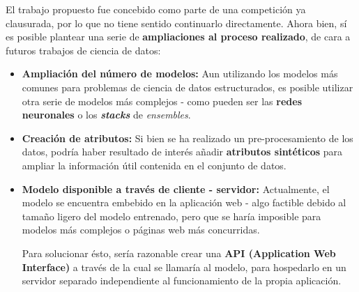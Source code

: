 El trabajo propuesto fue concebido como parte de una competición ya clausurada, por lo que no tiene sentido continuarlo directamente. Ahora bien, sí es posible plantear una serie de \textbf{ampliaciones al proceso realizado}, de cara a futuros trabajos de ciencia de datos:
\begin{itemize}[parsep=2pt, itemsep=2pt, topsep=4pt]
	\item \textbf{Ampliación del número de modelos:} Aun utilizando los modelos más comunes para problemas de ciencia de datos estructurados, es posible utilizar otra serie de modelos más complejos - como pueden ser las \textbf{redes neuronales} o los \textbf{\textit{stacks}} de \textit{ensembles}.
	\item \textbf{Creación de atributos:} Si bien se ha realizado un pre-procesamiento de los datos, podría haber resultado de interés añadir \textbf{atributos sintéticos} para ampliar la información útil contenida en el conjunto de datos.
	\item \textbf{Modelo disponible a través de cliente - servidor:} Actualmente, el modelo se encuentra embebido en la aplicación web - algo factible debido al tamaño ligero del modelo entrenado, pero que se haría imposible para modelos más complejos o páginas web más concurridas.
	
	Para solucionar ésto, sería razonable crear una \textbf{API (Application Web Interface)} a través de la cual se llamaría al modelo, para hospedarlo en un servidor separado independiente al funcionamiento de la propia aplicación.
\end{itemize}